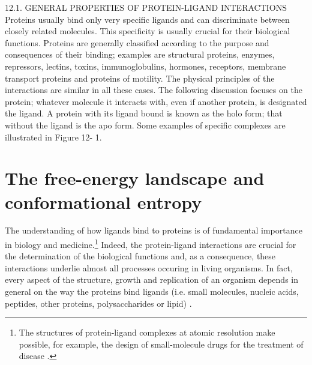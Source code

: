 12.1. GENERAL PROPERTIES OF PROTEIN-LIGAND INTERACTIONS
Proteins usually bind only very specific ligands and can discriminate between closely related
molecules. This specificity is usually crucial for their biological functions. Proteins are generally
classified according to the purpose and consequences of their binding; examples are structural
proteins, enzymes, repressors, lectins, toxins, immunoglobulins, hormones, receptors, membrane
transport proteins and proteins of motility. The physical principles of the interactions are similar in
all these cases. The following discussion focuses on the protein; whatever molecule it interacts with,
even if another protein, is designated the ligand. A protein with its ligand bound is known as the holo
form; that without the ligand is the apo form. Some examples of specific complexes are illustrated in
Figure 12- 1.
\cite{creighton2010biophysical}

\section{The free-energy landscape and conformational entropy}

The understanding of how ligands bind to proteins is of fundamental importance in biology and medicine.\footnote{The structures of protein-ligand complexes at atomic resolution make possible, for example, the design of small-molecule drugs for the treatment of disease \cite{dunn2001protein}.} Indeed, the protein-ligand interactions are crucial for the determination of the biological functions and, as a consequence, these interactions underlie almost all processes occuring in living organisms. In fact, every aspect of the structure, growth and replication of an organism depends in general on the way the proteins bind ligands (i.e. small molecules, nucleic acids, peptides, other proteins, polysaccharides or lipid) \cite{creighton2010biophysical}.

